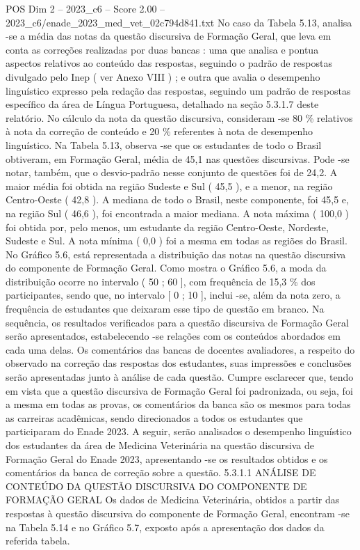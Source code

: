 \begin{textsample}{POS Dim 2 – 2023\_c6 – Score 2.00 – 2023\_c6/enade\_2023\_med\_vet\_02c794d841.txt}
No caso da Tabela 5.13, analisa -se a média das notas da questão discursiva de Formação Geral, que leva em conta as correções realizadas por duas bancas : uma que analisa e pontua aspectos relativos ao conteúdo das respostas, seguindo o padrão de respostas divulgado pelo Inep ( ver Anexo VIII ) ; e outra que avalia o desempenho linguístico expresso pela redação das respostas, seguindo um padrão de respostas específico da área de Língua Portuguesa, detalhado na seção 5.3.1.7 deste relatório.
No cálculo da nota da questão discursiva, consideram -se 80 \% relativos à nota da correção de conteúdo e 20 \% referentes à nota de desempenho linguístico.
Na Tabela 5.13, observa -se que os estudantes de todo o Brasil obtiveram, em Formação Geral, média de 45,1 nas questões discursivas.
Pode -se notar, também, que o desvio-padrão nesse conjunto de questões foi de 24,2.
A maior média foi obtida na região Sudeste e Sul ( 45,5 ), e a menor, na região Centro-Oeste ( 42,8 ).
A mediana de todo o Brasil, neste componente, foi 45,5 e, na região Sul ( 46,6 ), foi encontrada a maior mediana.
A nota máxima ( 100,0 ) foi obtida por, pelo menos, um estudante da região Centro-Oeste, Nordeste, Sudeste e Sul.
A nota mínima ( 0,0 ) foi a mesma em todas as regiões do Brasil.
No Gráfico 5.6, está representada a distribuição das notas na questão discursiva do componente de Formação Geral.
Como mostra o Gráfico 5.6, a moda da distribuição ocorre no intervalo ( 50 ; 60 ], com frequência de 15,3 \% dos participantes, sendo que, no intervalo [ 0 ; 10 ], inclui -se, além da nota zero, a frequência de estudantes que deixaram esse tipo de questão em branco.
Na sequência, os resultados verificados para a questão discursiva de Formação Geral serão apresentados, estabelecendo -se relações com os conteúdos abordados em cada uma delas.
Os comentários das bancas de docentes avaliadores, a respeito do observado na correção das respostas dos estudantes, suas impressões e conclusões serão apresentadas junto à análise de cada questão.
Cumpre esclarecer que, tendo em vista que a questão discursiva de Formação Geral foi padronizada, ou seja, foi a mesma em todas as provas, os comentários da banca são os mesmos para todas as carreiras acadêmicas, sendo direcionados a todos os estudantes que participaram do Enade 2023.
A seguir, serão analisados o desempenho linguístico dos estudantes da área de Medicina Veterinária na questão discursiva de Formação Geral do Enade 2023, apresentando -se os resultados obtidos e os comentários da banca de correção sobre a questão. 5.3.1.1 ANÁLISE DE CONTEÚDO DA QUESTÃO DISCURSIVA DO COMPONENTE DE FORMAÇÃO GERAL Os dados de Medicina Veterinária, obtidos a partir das respostas à questão discursiva do componente de Formação Geral, encontram -se na Tabela 5.14 e no Gráfico 5.7, exposto após a apresentação dos dados da referida tabela.

\end{textsample}
